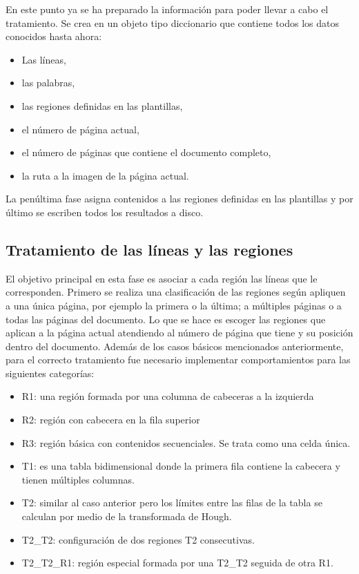En este punto ya se ha preparado la información para poder llevar a cabo el tratamiento. Se crea en un objeto tipo diccionario que contiene todos los datos conocidos hasta ahora:

\begin{itemize}
	\item Las líneas,
	\item las palabras,
	\item las regiones definidas en las plantillas,
	\item el número de página actual,
	\item el número de páginas que contiene el documento completo,
	\item la ruta a la imagen de la página actual.
\end{itemize}

La penúltima fase asigna contenidos a las regiones definidas en las plantillas y por último se escriben todos los resultados a disco.

\subsection{Tratamiento de las líneas y las regiones}

El objetivo principal en esta fase es asociar a cada región las líneas que le corresponden. Primero se realiza una clasificación de las regiones según apliquen a una única página, por ejemplo la primera o la última; a múltiples páginas o a todas las páginas del documento. Lo que se hace es escoger las regiones que aplican a la página actual atendiendo al número de página que tiene y su posición dentro del documento. Además de los casos básicos mencionados anteriormente, para el correcto tratamiento fue necesario implementar comportamientos para las siguientes categorías: 

\begin{itemize}
	\item R1: una región formada por una columna de cabeceras a la izquierda
	\item R2: región con cabecera en la fila superior
	\item R3: región básica con contenidos secuenciales. Se trata como una celda única.
	\item T1: es una tabla bidimensional donde la primera fila contiene la cabecera y tienen múltiples columnas.
	\item T2: similar al caso anterior pero los límites entre las filas de la tabla se calculan por medio de la transformada de Hough.
	\item T2\_T2: configuración de dos regiones T2 consecutivas.
	\item T2\_T2\_R1: región especial formada por una T2\_T2 seguida de otra R1.
\end{itemize}

